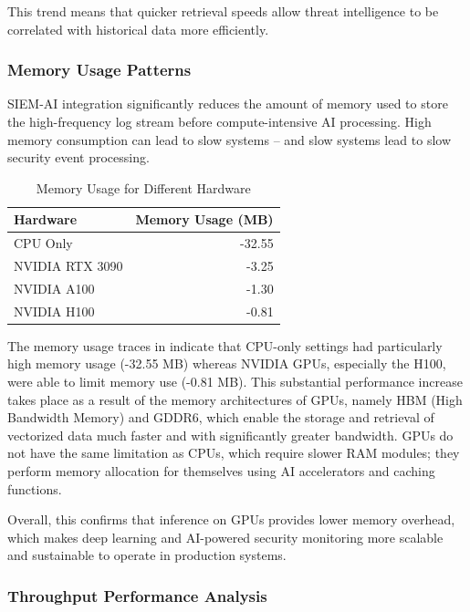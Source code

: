 This trend means that quicker retrieval speeds allow threat intelligence to be correlated with historical data more efficiently.

\subsubsection{Memory Usage Patterns}
\label{subsubsec_memory_usage_patterns}

SIEM-AI integration significantly reduces the amount of memory used to store the high-frequency log stream before compute-intensive AI processing. High memory consumption can lead to slow systems -- and slow systems lead to slow security event processing.

\begin{table}[h!]
\centering
\begin{tabular}{lr}
\hline
\textbf{Hardware} & \textbf{Memory Usage (MB)} \\
\hline
CPU Only & -32.55 \\
NVIDIA RTX 3090 & -3.25 \\
NVIDIA A100 & -1.30 \\
NVIDIA H100 & -0.81 \\
\hline
\end{tabular}
\caption{Memory Usage for Different Hardware}
\label{tab:memory-usage-hardware}
\end{table}

The memory usage traces in  indicate that CPU-only settings had particularly high memory usage (-32.55 MB) whereas NVIDIA GPUs, especially the H100, were able to limit memory use (-0.81 MB). This substantial performance increase takes place as a result of the memory architectures of GPUs, namely HBM (High Bandwidth Memory) and GDDR6, which enable the storage and retrieval of vectorized data much faster and with significantly greater bandwidth. GPUs do not have the same limitation as CPUs, which require slower RAM modules; they perform memory allocation for themselves using AI accelerators and caching functions.

Overall, this confirms that inference on GPUs provides lower memory overhead, which makes deep learning and AI-powered security monitoring more scalable and sustainable to operate in production systems.

\subsubsection{Throughput Performance Analysis}
\label{subsubsec_throughput_performance_analysis}

